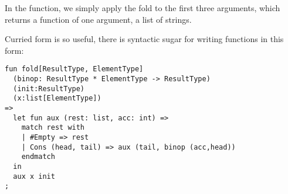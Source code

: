 \documentclass[oneside]{book}
\begin{document}
In the function, we simply apply the fold to the
first three arguments, which returns a function 
of one argument, a list of strings.

Curried form is so useful, there is syntactic sugar
for writing functions in this form:

\begin{verbatim}
fun fold[ResultType, ElementType] 
  (binop: ResultType * ElementType -> ResultType)
  (init:ResultType)
  (x:list[ElementType])
=>
  let fun aux (rest: list, acc: int) =>
    match rest with
    | #Empty => rest
    | Cons (head, tail) => aux (tail, binop (acc,head))
    endmatch
  in 
  aux x init
;
\end{verbatim}
\end{document}
